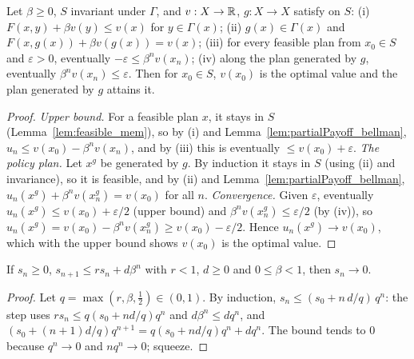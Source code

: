 \begin{theorem}
\label{thm:verification}
\leanok
{}
Let $\beta \ge 0$, $S$ invariant under $\Gamma$, and $v : X \to \mathbb{R}$, $g : X \to X$ satisfy on $S$:
(i) $F(x, y) + \beta v(y) \le v(x)$ for $y \in \Gamma(x)$;
(ii) $g(x) \in \Gamma(x)$ and $F(x, g(x)) + \beta v(g(x)) = v(x)$;
(iii) for every feasible plan from $x_0 \in S$ and $\varepsilon > 0$, eventually
$-\varepsilon \le \beta^n v(x_n)$;
(iv) along the plan generated by $g$, eventually $\beta^n v(x_n) \le \varepsilon$.
Then for $x_0 \in S$, $v(x_0)$ is the optimal value and the plan generated by $g$ attains it.
\end{theorem}
\begin{proof}
\leanok
\emph{Upper bound.} For a feasible plan $x$, it stays in $S$ (Lemma~\ref{lem:feasible_mem}), so by (i)
and Lemma~\ref{lem:partialPayoff_bellman}, $u_n \le v(x_0) - \beta^n v(x_n)$, and by (iii) this is
eventually $\le v(x_0) + \varepsilon$.
\emph{The policy plan.} Let $x^g$ be generated by $g$. By induction it stays in $S$ (using (ii) and
invariance), so it is feasible, and by (ii) and Lemma~\ref{lem:partialPayoff_bellman},
$u_n(x^g) + \beta^n v(x^g_n) = v(x_0)$ for all $n$.
\emph{Convergence.} Given $\varepsilon$, eventually $u_n(x^g) \le v(x_0) + \varepsilon/2$ (upper bound)
and $\beta^n v(x^g_n) \le \varepsilon/2$ (by (iv)), so
$u_n(x^g) = v(x_0) - \beta^n v(x^g_n) \ge v(x_0) - \varepsilon/2$. Hence $u_n(x^g) \to v(x_0)$, which
with the upper bound shows $v(x_0)$ is the optimal value.
\end{proof}

\begin{lemma}
\label{lem:tendsto_zero_rec}
\leanok
If $s_n \ge 0$, $s_{n+1} \le r s_n + d \beta^n$ with $r < 1$, $d \ge 0$ and $0 \le \beta < 1$, then
$s_n \to 0$.
\end{lemma}
\begin{proof}
\leanok
Let $q = \max(r, \beta, \tfrac12) \in (0, 1)$. By induction, $s_n \le (s_0 + n\, d/q)\, q^n$: the step uses
$r s_n \le q (s_0 + n d/q) q^n$ and $d \beta^n \le d q^n$, and
$(s_0 + (n+1) d/q) q^{n+1} = q (s_0 + n d/q) q^n + d q^n$. The bound tends to $0$ because $q^n \to 0$
and $n q^n \to 0$; squeeze.
\end{proof}

